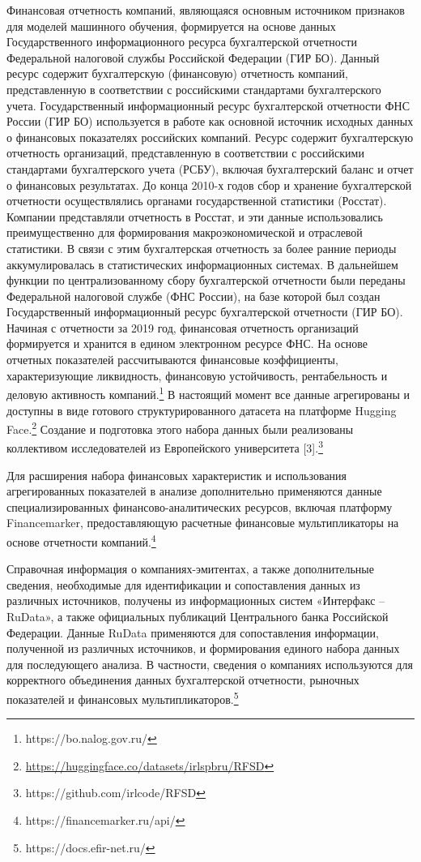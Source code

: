 \documentclass[
]{article}
\begin{document}
Финансовая отчетность компаний, являющаяся основным источником признаков для моделей машинного обучения, формируется на основе данных Государственного информационного ресурса бухгалтерской отчетности Федеральной налоговой службы Российской Федерации (ГИР БО). Данный ресурс содержит бухгалтерскую (финансовую) отчетность компаний, представленную в соответствии с российскими стандартами бухгалтерского учета. Государственный информационный ресурс бухгалтерской отчетности ФНС России (ГИР БО) используется в работе как основной источник исходных данных о финансовых показателях российских компаний. Ресурс содержит бухгалтерскую отчетность организаций, представленную в соответствии с российскими стандартами бухгалтерского учета (РСБУ), включая бухгалтерский баланс и отчет о финансовых результатах. До конца 2010-х годов сбор и хранение бухгалтерской отчетности осуществлялись органами государственной статистики (Росстат). Компании представляли отчетность в Росстат, и эти данные использовались преимущественно для формирования макроэкономической и отраслевой статистики. В связи с этим бухгалтерская отчетность за более ранние периоды аккумулировалась в статистических информационных системах. В дальнейшем функции по централизованному сбору бухгалтерской отчетности были переданы Федеральной налоговой службе (ФНС России), на базе которой был создан Государственный информационный ресурс бухгалтерской отчетности (ГИР БО). Начиная с отчетности за 2019 год, финансовая отчетность организаций формируется и хранится в едином электронном ресурсе ФНС. На основе отчетных показателей рассчитываются финансовые коэффициенты, характеризующие ликвидность, финансовую устойчивость, рентабельность и деловую активность компаний.\footnote{https://bo.nalog.gov.ru/} В настоящий момент все данные агрегированы и доступны в виде готового структурированного датасета на платформе Hugging Face.\footnote{\url{https://huggingface.co/datasets/irlspbru/RFSD}} Создание и подготовка этого набора данных были реализованы коллективом исследователей из Европейского университета {[}3{]}.\footnote{https://github.com/irlcode/RFSD}

Для расширения набора финансовых характеристик и использования агрегированных показателей в анализе дополнительно применяются данные специализированных финансово-аналитических ресурсов, включая платформу Financemarker, предоставляющую расчетные финансовые мультипликаторы на основе отчетности компаний.\footnote{https://financemarker.ru/api/}

Справочная информация о компаниях-эмитентах, а также дополнительные сведения, необходимые для идентификации и сопоставления данных из различных источников, получены из информационных систем «Интерфакс -- RuData», а также официальных публикаций Центрального банка Российской Федерации. Данные RuData применяются для сопоставления информации, полученной из различных источников, и формирования единого набора данных для последующего анализа. В частности, сведения о компаниях используются для корректного объединения данных бухгалтерской отчетности, рыночных показателей и финансовых мультипликаторов.\footnote{https://docs.efir-net.ru/}
\end{document}

